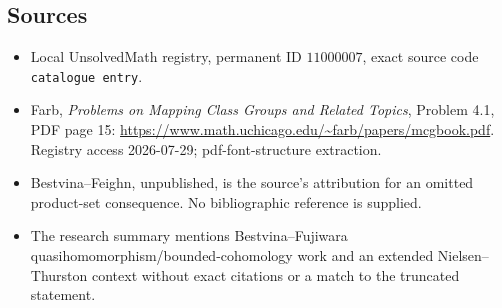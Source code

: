 \documentclass[11pt]{article}
\begin{document}
\subsection{Sources}
\begin{itemize}
\item Local UnsolvedMath registry, permanent ID \(11000007\), exact source code \texttt{catalogue entry}.
\item Farb, \emph{Problems on Mapping Class Groups and Related Topics}, Problem 4.1, PDF page 15: \url{https://www.math.uchicago.edu/~farb/papers/mcgbook.pdf}. Registry access 2026-07-29; pdf-font-structure extraction.
\item Bestvina--Feighn, unpublished, is the source's attribution for an omitted product-set consequence. No bibliographic reference is supplied.
\item The research summary mentions Bestvina--Fujiwara quasihomomorphism/bounded-cohomology work and an extended Nielsen--Thurston context without exact citations or a match to the truncated statement.
\end{itemize}
\end{document}
